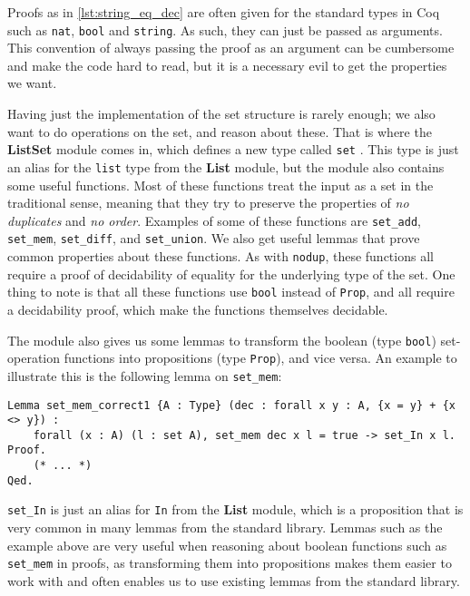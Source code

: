 Proofs as in \autoref{lst:string_eq_dec} are often given for the standard types in Coq such as \lstinline{nat},
\lstinline{bool} and \lstinline{string}.
As such, they can just be passed as arguments.
This convention of always passing the proof as an argument can be cumbersome and make the code hard to read,
but it is a necessary evil to get the properties we want.

Having just the implementation of the set structure is rarely enough; we also want to do operations on the set, and reason about these.
That is where the \textbf{ListSet} module comes in, which defines a new type called \lstinline{set} \cite{coqlistset}.
This type is just an alias for the \lstinline{list} type from the \textbf{List} module,
but the module also contains some useful functions.
Most of these functions treat the input as a set in the traditional sense,
meaning that they try to preserve the properties of \textit{no duplicates} and \textit{no order}.
Examples of some of these functions are \lstinline{set_add}, \lstinline{set_mem},
\lstinline{set_diff}, and \lstinline{set_union}.
We also get useful lemmas that prove common properties about these functions.
As with \lstinline{nodup}, these functions all require a proof of decidability of equality for the underlying type of the set.
One thing to note is that all these functions use \lstinline{bool} instead of
\lstinline{Prop}, and all require a decidability proof, which make the functions themselves decidable.

The module also gives us some lemmas to transform the boolean (type \lstinline{bool}) set-operation functions into
propositions (type \lstinline{Prop}), and vice versa. An example to illustrate this is the following lemma on \lstinline{set_mem}:

\begin{minipage}{\linewidth}
\begin{lstlisting}[language=Coq, label={lst:set_mem_correct1}, caption={\lstinline{set_mem} lemma in \lstinline{ListSet} module}]
Lemma set_mem_correct1 {A : Type} (dec : forall x y : A, {x = y} + {x <> y}) :
    forall (x : A) (l : set A), set_mem dec x l = true -> set_In x l.
Proof.
    (* ... *)
Qed.
\end{lstlisting}
\end{minipage}

\lstinline{set_In} is just an alias for \lstinline{In} from the \textbf{List} module,
which is a proposition that is very common in many lemmas from the standard library.
Lemmas such as the example above are very useful when reasoning about boolean functions such as
\lstinline{set_mem} in proofs, as transforming them into propositions makes them easier to work with
and often enables us to use existing lemmas from the standard library.


